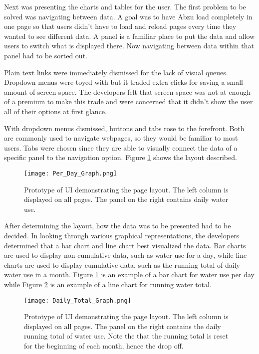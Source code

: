 \documentclass[journal]{IEEEtran}
\begin{document}
Next was presenting the charts and tables for the user. The first problem to be solved was navigating between data. A goal was to have Abzu load completely in one page so that users didn't have to load and reload pages every time they wanted to see different data. A panel is a familiar place to put the data and allow users to switch what is displayed there. Now navigating between data within that panel had to be sorted out.

Plain text links were immediately dismissed for the lack of visual queues. Dropdown menus were toyed with but it traded extra clicks for saving a small amount of screen space. The developers felt that screen space was not at enough of a premium to make this trade and were concerned that it didn't show the user all of their options at first glance.

With dropdown menus dismissed, buttons and tabs rose to the forefront. Both are commonly used to navigate webpages, so they would be familiar to most users. Tabs were chosen since they are able to visually connect the data of a specific panel to the navigation option. Figure \ref{fig:daygraph} shows the layout described.

\begin{figure}[H]
  \texttt{[image: Per\_Day\_Graph.png]}
  \caption{Prototype of UI demonstrating the page layout. The left column is displayed on all pages. The panel on the right contains daily water use.}
  \label{fig:daygraph}
\end{figure}

After determining the layout, how the data was to be presented had to be decided. In looking through various graphical representations, the developers determined that a bar chart and line chart best visualized the data. Bar charts are used to display non-cumulative data, such as water use for a day, while line charts are used to display cumulative data, such as the running total of daily water use in a month. Figure \ref{fig:daygraph} is an example of a bar chart for water use per day while Figure \ref{fig:daytotal} is an example of a line chart for running water total.

\begin{figure}[H]
  \texttt{[image: Daily\_Total\_Graph.png]}
  \caption{Prototype of UI demonstrating the page layout. The left column is displayed on all pages. The panel on the right contains the daily running total of water use. Note the that the running total is reset for the beginning of each month, hence the drop off.}
  \label{fig:daytotal}
\end{figure}
\end{document}

